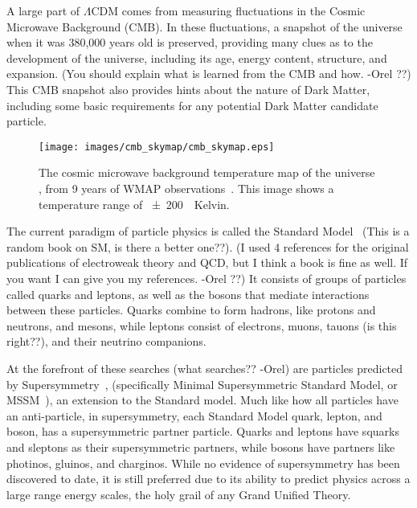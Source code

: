   A large part of $\Lambda$CDM comes from measuring fluctuations in the Cosmic Microwave Background (CMB).
  In these fluctuations, a snapshot of the universe when it was 380,000 years old is preserved, providing many clues as to the development of the universe, including its age, energy content, structure, and expansion. 
  {\color{red}(You should explain what is learned from the CMB and how. -Orel ??)}
  This CMB snapshot also provides hints about the nature of Dark Matter, including some basic requirements for any potential Dark Matter candidate particle.

  \begin{figure}[ht]
    \texttt{[image: images/cmb\_skymap/cmb\_skymap.eps]}
    \caption[The Cosmic Microwave Background]{
      The cosmic microwave background temperature map of the universe \cite{wmap_skymap}, from 9 years of WMAP observations~\cite{wmap9year}.
      This image shows a temperature range of \SI{\pm200}{\mu{}Kelvin}.
    }
    \label{fig:cmb}
  \end{figure}

  The current paradigm of particle physics is called the Standard Model~\cite{standardmodel} {\color{red}(This is a random book on SM, is there a better one??)}.
  {\color{red}(I used 4 references for the original publications of electroweak theory and QCD, but I think a book is fine as well. If you want I can give you my references. -Orel ??)}
  It consists of groups of particles called quarks and leptons, as well as the bosons that mediate interactions between these particles.
  Quarks combine to form hadrons, like protons and neutrons, and mesons, while leptons consist of electrons, muons, {\color{red}tauons (is this right??)}, and their neutrino companions.

  At the forefront of {\color{red}these searches (what searches?? -Orel)} are particles predicted by Supersymmetry~\cite{Jungman:1995df}, (specifically Minimal Supersymmetric Standard Model, or MSSM~\cite{MSSM}), an extension to the Standard model.
  Much like how all particles have an anti-particle, in supersymmetry, each Standard Model quark, lepton, and boson, has a supersymmetric partner particle.
  Quarks and leptons have squarks and sleptons as their supersymmetric partners, while bosons have partners like photinos, gluinos, and charginos.
  While no evidence of supersymmetry has been discovered to date, it is still preferred due to its ability to predict physics across a large range energy scales, the holy grail of any Grand Unified Theory.
  

